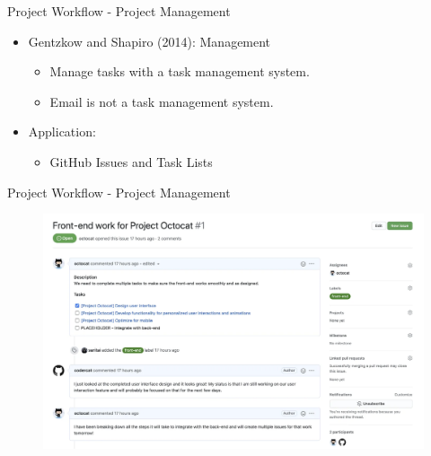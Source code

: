 \documentclass{beamer}
\begin{document}
\begin{frame}{Project Workflow - Project Management}
    \begin{itemize}
        \item Gentzkow and Shapiro (2014): Management
            \begin{itemize}
                \item Manage tasks with a task management system.
                \item Email is not a task management system.
        \end{itemize}
        \item Application:
            \begin{itemize}
                \item GitHub Issues and Task Lists
            \end{itemize}
    \end{itemize}
\end{frame}

\begin{frame}{Project Workflow - Project Management}
    \begin{figure}
        \includegraphics[scale=0.45]{manage.png}
    \end{figure}    
\end{frame}
\end{document}
